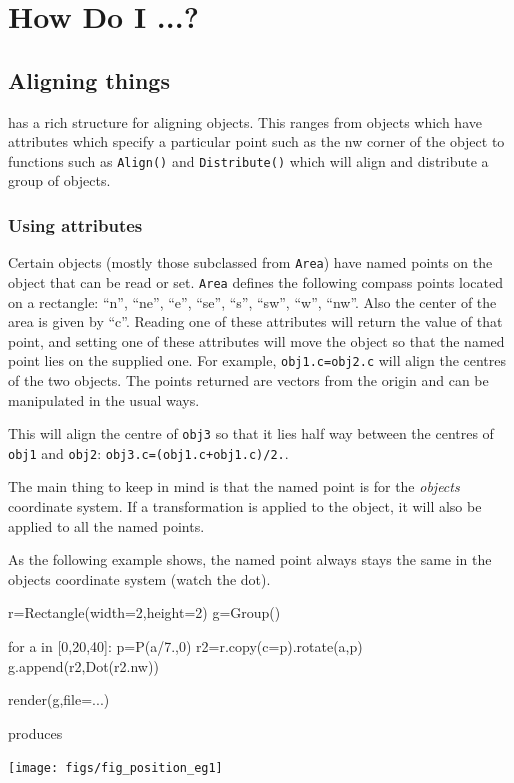 \documentclass[a4paper]{book}
\begin{document}
\chapter{How Do I ...?}
\label{cha:howto}

\section{Aligning things}

\pyscript has a rich structure for aligning objects. This ranges
from objects which have attributes which specify a particular point
such as the nw corner of the object to functions such as
\Verb|Align()| and \Verb|Distribute()| which will align and distribute a 
group of objects.

\subsection{Using attributes}

Certain objects (mostly those subclassed from \Verb|Area|) have named points
on the object that can be read or set. \Verb|Area| defines the
following compass points located on a rectangle: ``n'', ``ne'',
``e'', ``se'', ``s'', ``sw'', ``w'', ``nw''. Also the center of the
area is given by ``c''. Reading one of these attributes will return
the value of that point, and setting one of
these attributes will move the object so that the named point lies
on the supplied one. For example, \Verb|obj1.c=obj2.c| will align the
centres of the two objects. The points returned are vectors from the origin 
and can be manipulated in the usual ways.
\begin{example}
  This will align the centre of \Verb|obj3| so that it lies half way
  between the centres of \Verb|obj1| and \Verb|obj2|:
  \Verb|obj3.c=(obj1.c+obj1.c)/2.|.
\end{example}

The main thing to keep in mind is that the named point is for the
\emph{objects} coordinate system. If a transformation is applied to
the object, it will also be applied to all the named points.
\begin{example}
  As the following example shows, the named point always stays the same 
  in the objects coordinate system (watch the dot).
\begin{python}
r=Rectangle(width=2,height=2)
g=Group()

for a in [0,20,40]:
    p=P(a/7.,0)
    r2=r.copy(c=p).rotate(a,p)
    g.append(r2,Dot(r2.nw))

render(g,file=...)
\end{python}
produces
\begin{center}
  \texttt{[image: figs/fig\_position\_eg1]}
\end{center}
\end{example}
\end{document}
